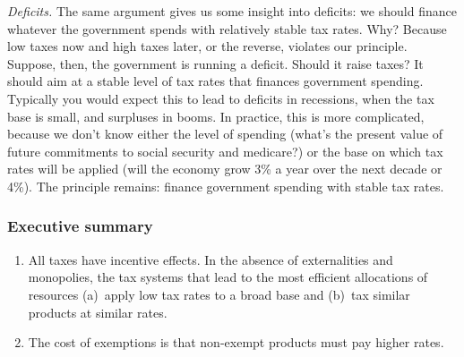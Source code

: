 \documentclass[letterpaper,12pt]{article}
\begin{document}
{\it Deficits.\/}
The same argument gives us some insight into deficits:
we should finance whatever the government spends
with relatively stable tax rates.
Why?  Because low taxes now and high taxes later, or the reverse,
violates our principle.
Suppose, then, the government is running a deficit.
Should it raise taxes?
It should aim at a stable level of tax rates
that finances government spending.
Typically you would expect this to lead to deficits in recessions,
when the tax base is small, and surpluses in booms.
In practice, this is more complicated, because we don't know either the level
of spending (what's the present value of future commitments to
social security and medicare?)
or the base on which tax rates will be applied
(will the economy grow 3\% a year over the next decade or 4\%).
The principle remains:
finance government spending with stable tax rates.

\begin{comment}
{\it Tax arbitrage.}
Differences in tax rates lead to obvious incentives to relabel
a high-tax item as a low-tax item.
In the UK, taxes are more favorable to capital expenditures
on equipment than structures
(equipment is expensed, structures are amortized),
so there's an incentive for firms to interpret equipment broadly.
In Ireland, the corporate tax rate is very low,
so multinational firms have an incentive to shift profits from
(say) the US to Ireland.
(How might they do this?)
In the US, corporate taxes place a cap on the deductability of
executive salaries, but not on other forms of compensation (stock options,
for example), which creates an incentive for firms to pay executives
through the latter.
\end{comment}


\subsubsection*{Executive summary}

\begin{enumerate}

\item All taxes have incentive effects.  In the absence of externalities and monopolies, the tax
systems that lead to the most efficient allocations of resources
(a)~apply low tax rates to a broad base
and (b)~tax similar products at similar rates.

\item The cost of exemptions is that non-exempt products must pay higher rates.

\end{enumerate}
\end{document}
